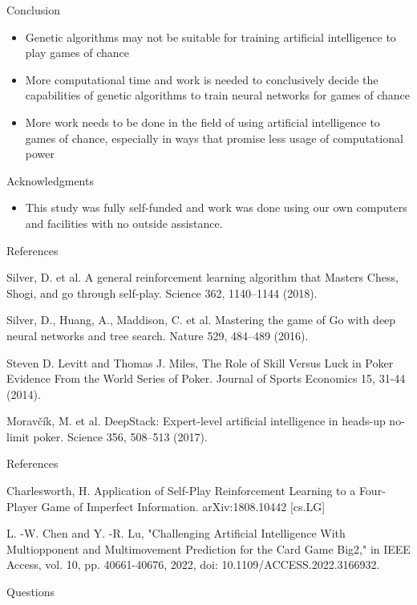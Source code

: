 \documentclass{beamer}
\begin{document}
\begin{frame}{Conclusion}
	\begin{itemize}
		\item Genetic algorithms may not be suitable for training artificial intelligence to play games of chance
		\item More computational time and work is needed to conclusively decide the capabilities of genetic algorithms to train neural networks for games of chance
		\item More work needs to be done in the field of using artificial intelligence to games of chance, especially in ways that promise less usage of computational power
	\end{itemize}
\end{frame}

\begin{frame}{Acknowledgments}
	\begin{itemize}
		\item This study was fully self-funded and work was done using our own computers and facilities with no outside assistance.
	\end{itemize}
\end{frame}

\begin{frame}{References}
		\begin{thebibliography}{9}
			Silver, D. et al. A general reinforcement learning algorithm that Masters Chess, Shogi, and go through self-play. Science 362, 1140–1144 (2018). 
			
			Silver, D., Huang, A., Maddison, C. et al. Mastering the game of Go with deep neural networks and tree search. Nature 529, 484–489 (2016). 
			
			Steven D. Levitt and Thomas J. Miles,
			The Role of Skill Versus Luck in Poker Evidence From the World Series of Poker. Journal of Sports Economics 15, 31-44 (2014).
			
			Moravčík, M. et al. DeepStack: Expert-level artificial intelligence in heads-up no-limit poker. Science 356, 508–513 (2017). 
			
		\end{thebibliography}
\end{frame}
	
\begin{frame}{References}
	\begin{thebibliography}{9}
		\bibitem{big2ai}
		Charlesworth, H. Application of Self-Play Reinforcement Learning to a Four-Player Game of Imperfect Information. arXiv:1808.10442 [cs.LG]
		
		\bibitem{big2aitree}
		L. -W. Chen and Y. -R. Lu, "Challenging Artificial Intelligence With Multiopponent and Multimovement Prediction for the Card Game Big2," in IEEE Access, vol. 10, pp. 40661-40676, 2022, doi: 10.1109/ACCESS.2022.3166932.
	\end{thebibliography}
\end{frame}

\begin{frame}{Questions}
	
\end{frame}
\end{document}
